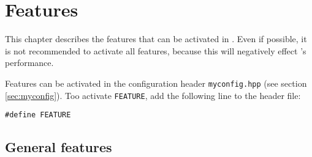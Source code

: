 %  
%   
%  
%  
%
\chapter{Features}
\label{chap:features}


This chapter describes the features that can be activated in \es. Even
if possible, it is not recommended to activate all features, because
this will negatively effect \es's performance.

Features can be activated in the configuration header
\texttt{myconfig.hpp} (see section \vref{sec:myconfig}). Too activate
\texttt{FEATURE}, add the following line to the header file:
\begin{verbatim}
#define FEATURE
\end{verbatim}

\section{General features}


